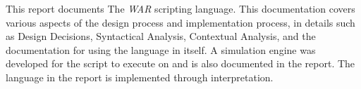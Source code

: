 This report documents The \textit{WAR} scripting language. This documentation covers various aspects of the design process and implementation process, in details such as Design Decisions, Syntactical Analysis, Contextual Analysis, and the documentation for using the language in itself. A simulation engine was developed for the script to execute on and is also documented in the report. The language in the report is implemented through interpretation.